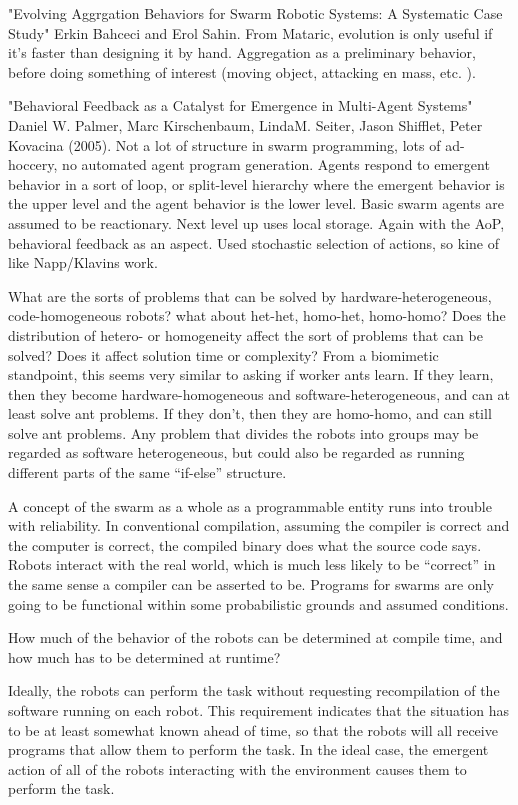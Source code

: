 \documentclass[]{article}
\begin{document}
"Evolving Aggrgation Behaviors for Swarm Robotic Systems: A Systematic Case Study" \cite{bahgecci2005evolving} Erkin Bahceci and Erol Sahin. From Mataric, evolution is only useful if it's faster than designing it by hand. Aggregation as a preliminary behavior, before doing something of interest (moving object, attacking en mass, etc. ). 

"Behavioral Feedback as a Catalyst for Emergence in Multi-Agent Systems" \cite{palmer2005behavioral} Daniel W. Palmer, Marc Kirschenbaum, LindaM. Seiter, Jason Shifflet, Peter Kovacina (2005). Not a lot of structure in swarm programming, lots of ad-hoccery, no automated agent program generation. Agents respond to emergent behavior in a sort of loop, or split-level hierarchy where the emergent behavior is the upper level and the agent behavior is the lower level. Basic swarm agents are assumed to be reactionary. Next level up uses local storage. Again with the AoP, behavioral feedback as an aspect. Used stochastic selection of actions, so kine of like Napp/Klavins work. 

What are the sorts of problems that can be solved by hardware-heterogeneous, code-homogeneous robots? what about het-het, homo-het, homo-homo? Does the distribution of hetero- or homogeneity affect the sort of problems that can be solved? Does it affect solution time or complexity? From a biomimetic standpoint, this seems very similar to asking if worker ants learn. If they learn, then they become hardware-homogeneous and software-heterogeneous, and can at least solve ant problems. If they don't, then they are homo-homo, and can still solve ant problems. Any problem that divides the robots into groups may be regarded as software heterogeneous, but could also be regarded as running different parts of the same ``if-else'' structure. 

A concept of the swarm as a whole as a programmable entity runs into trouble with reliability. In conventional compilation, assuming the compiler is correct and the computer is correct, the compiled binary does what the source code says. Robots interact with the real world, which is much less likely to be ``correct'' in the same sense a compiler can be asserted to be. Programs for swarms are only going to be functional within some probabilistic grounds and assumed conditions. 

How much of the behavior of the robots can be determined at compile time, and how much has to be determined at runtime?

Ideally, the robots can perform the task without requesting recompilation of the software running on each robot. 
This requirement indicates that the situation has to be at least somewhat known ahead of time, so that the robots will all receive programs that allow them to perform the task.
In the ideal case, the emergent action of all of the robots interacting with the environment causes them to perform the task. 
\end{document}
